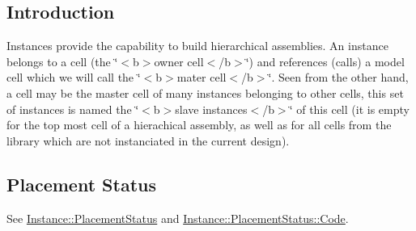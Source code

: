 \hypertarget{classHurricane_1_1Instance_secInstanceIntro}{}\subsection{Introduction}\label{classHurricane_1_1Instance_secInstanceIntro}
Instances provide the capability to build hierarchical assemblies. An instance belongs to a cell (the \char`\"{}$<$b$>$owner 
              cell$<$/b$>$\char`\"{}) and references (calls) a model cell which we will call the \char`\"{}$<$b$>$mater cell$<$/b$>$\char`\"{}. Seen from the other hand, a cell may be the master cell of many instances belonging to other cells, this set of instances is named the \char`\"{}$<$b$>$slave 
              instances$<$/b$>$\char`\"{} of this cell (it is empty for the top most cell of a hierachical assembly, as well as for all cells from the library which are not instanciated in the current design).\hypertarget{classHurricane_1_1Instance_secInstancePlacement}{}\subsection{Placement Status}\label{classHurricane_1_1Instance_secInstancePlacement}
See \hyperlink{classHurricane_1_1Instance_1_1PlacementStatus}{Instance\-::\-Placement\-Status} and \hyperlink{classHurricane_1_1Instance_1_1PlacementStatus_af76cc0838783b3eb3a515eb3c3e0f7bf}{Instance\-::\-Placement\-Status\-::\-Code}.

